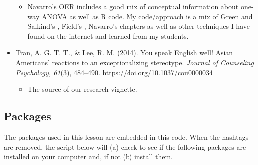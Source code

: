 \documentclass[
  11pt,
]{book}
\providecommand{\tightlist}{%
  \setlength{\itemsep}{0pt}\setlength{\parskip}{0pt}}
\begin{document}
\begin{itemize}
  \begin{itemize}
  \tightlist
  \item
    Navarro's OER includes a good mix of conceptual information about one-way ANOVA as well as R code. My code/approach is a mix of Green and Salkind's \citeyearpar{green_using_2017}, Field's \citeyearpar{field_discovering_2012}, Navarro's \citeyearpar{navarro_chapter_2020} chapters as well as other techniques I have found on the internet and learned from my students.
  \end{itemize}
\item
  Tran, A. G. T. T., \& Lee, R. M. (2014). You speak English well! Asian Americans' reactions to an exceptionalizing stereotype. \emph{Journal of Counseling Psychology, 61}(3), 484--490. \url{https://doi.org/10.1037/cou0000034}

  \begin{itemize}
  \tightlist
  \item
    The source of our research vignette.
  \end{itemize}
\end{itemize}

\hypertarget{packages-3}{%
\subsection{Packages}\label{packages-3}}

The packages used in this lesson are embedded in this code. When the hashtags are removed, the script below will (a) check to see if the following packages are installed on your computer and, if not (b) install them.
\end{document}
